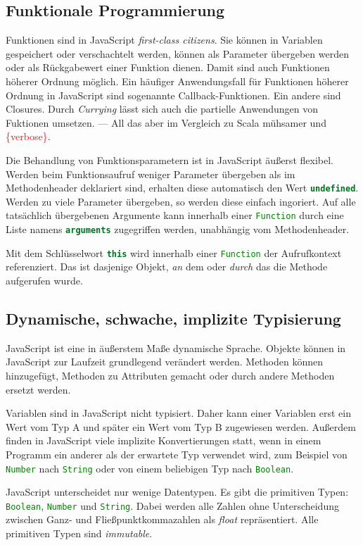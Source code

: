 \documentclass[a4paper, 12pt, hidelinks, listof=totoc, listoftables=totoc, bibliography=totoc]{scrreprt}
\newcommand{\js}[1]{\lstinline[language=JavaScript, style=inline]|#1|}
\newcommand{\TODOi}[1]{\textcolor{red}{\{#1\}}}
\begin{document}
\subsection{Funktionale Programmierung}

Funktionen sind in JavaScript \textit{first-class citizens}. Sie können in Variablen gespeichert oder verschachtelt werden, können als Parameter übergeben werden oder als Rückgabewert einer Funktion dienen. Damit sind auch Funktionen höherer Ordnung möglich. Ein häufiger Anwendungsfall für Funktionen höherer Ordnung in JavaScript sind sogenannte Callback-Funktionen. Ein andere sind Closures. Durch \textit{Currying} lässt sich auch die partielle Anwendungen von Fuktionen umsetzen. --- All das aber im Vergleich zu Scala mühsamer und \TODOi{verbose}.

Die Behandlung von Funktionsparametern ist in JavaScript äußerst flexibel. Werden beim Funktionsaufruf weniger Parameter übergeben als im Methodenheader deklariert sind, erhalten diese automatisch den Wert \js{undefined}. Werden zu viele Parameter übergeben, so werden diese einfach ingoriert. Auf alle tatsächlich übergebenen Argumente kann innerhalb einer \js{Function} durch eine Liste namens \js{arguments} zugegriffen werden, unabhängig vom Methodenheader.

Mit dem Schlüsselwort \js{this} wird innerhalb einer \js{Function} der Aufrufkontext referenziert. Das ist dasjenige Objekt, \textit{an} dem oder \textit{durch} das die Methode aufgerufen wurde. 
\cite[199 ff.]{flanagan2011.JDG}

\subsection{Dynamische, schwache, implizite Typisierung}

JavaScript ist eine in äußerstem Maße dynamische Sprache. Objekte können in JavaScript zur Laufzeit grundlegend verändert werden. Methoden können hinzugefügt, Methoden zu Attributen gemacht oder durch andere Methoden ersetzt werden.

Variablen sind in JavaScript nicht typisiert. Daher kann einer Variablen erst ein Wert vom Typ A und später ein Wert vom Typ B zugewiesen werden. Außerdem finden in JavaScript viele implizite Konvertierungen statt, wenn in einem Programm ein anderer als der erwartete Typ verwendet wird, zum Beispiel von \js{Number} nach \js{String} oder von einem beliebigen Typ nach \js{Boolean}.

JavaScript unterscheidet nur wenige Datentypen. Es gibt die primitiven Typen: \js{Boolean}, \js{Number} und \js{String}. 
Dabei werden alle Zahlen ohne Unterscheidung zwischen Ganz- und Fließpunktkommazahlen als \textit{float} repräsentiert. Alle primitiven Typen sind \textit{immutable}.
\end{document}
